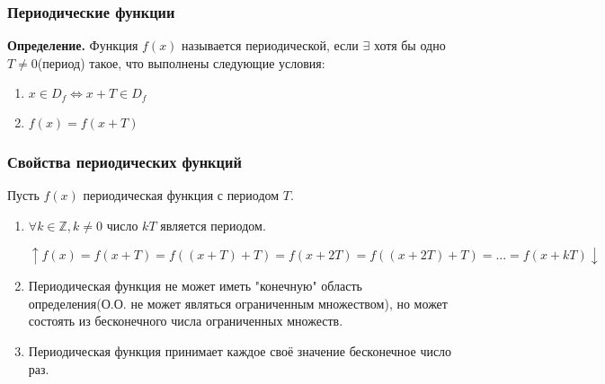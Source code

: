 \documentclass{article}
\begin{document}
    \subsubsection{Периодические функции}
    
    \textbf{Определение.} Функция \(f(x)\) называется периодической, если \(\exists\) хотя бы одно \(T \not = 0\)(период) такое, что выполнены следующие условия:
    \begin{enumerate}
        \item \(x \in D_f \Leftrightarrow x + T \in D_f\)
        \item \(f(x)=f(x+T)\)
    \end{enumerate}

    \subsubsection{Свойства периодических функций}

    Пусть \(f(x)\) периодическая функция с периодом \(T\).
    \begin{enumerate}
        \item \(\forall k \in \mathbb{Z}, k \not = 0\) число \(kT\) является периодом.
        
        \(\uparrow f(x)=f(x+T)=f((x+T)+T)=f(x+2T)=f((x+2T)+T)=...=f(x+kT) \downarrow\)
        \item Периодическая функция не может иметь "конечную" область определения(О.О. не может являться ограниченным множеством),
        но может состоять из бесконечного числа ограниченных множеств.
        \item Периодическая функция принимает каждое своё значение бесконечное число раз.
    \end{enumerate}
\end{document}
